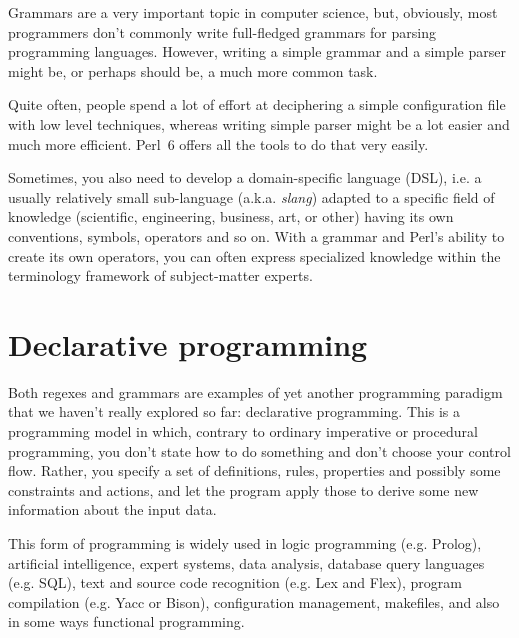 Grammars are a very important topic in computer science, 
but, obviously, most programmers don't commonly write 
full-fledged grammars for parsing programming languages. 
However, writing a simple grammar and a simple parser 
might be, or perhaps should be, a much more common task. 

Quite often, people spend a lot of effort at deciphering a 
simple configuration file with low level techniques, whereas 
writing simple parser might be a lot easier and much more 
efficient. Perl~6 offers all the tools to do that 
very easily.

Sometimes, you also need to develop a domain-specific 
language (DSL), i.e. a usually relatively small sub-language 
(a.k.a. \emph{slang}) adapted to a specific field of 
knowledge (scientific, engineering, business, art, or other) 
having its own conventions, symbols, operators and so on. 
With a grammar and Perl's ability to create its own operators, 
you can often express specialized knowledge within the 
terminology framework of subject-matter experts.

\section{Declarative programming}

Both regexes and grammars are examples of yet another programming 
paradigm that we haven't really explored so far: declarative 
programming. This is a programming model in which, contrary 
to ordinary imperative or procedural programming, you don't 
state how to do something and don't choose your control flow. 
Rather, you specify a set of definitions, rules, properties 
and possibly some constraints and actions, and let the program 
apply those to derive some new information about the input 
data. 


This form of programming is widely used in logic programming 
(e.g. Prolog), artificial intelligence, expert systems, 
data analysis, database query languages (e.g. SQL), text and 
source code recognition (e.g. Lex and Flex), program 
compilation (e.g. Yacc or Bison), configuration management, 
makefiles, and also in some ways functional programming.



